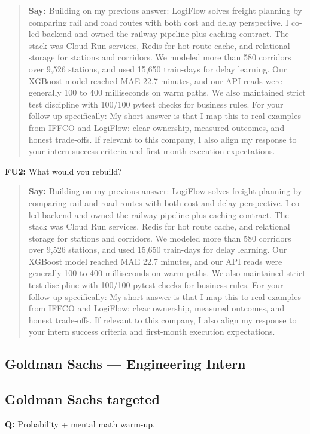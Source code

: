 \documentclass[9pt,a4paper]{article}
\begin{document}
\begin{quote}\small\textbf{Say:} Building on my previous answer: LogiFlow solves freight planning by comparing rail and road routes with both cost and delay perspective. I co-led backend and owned the railway pipeline plus caching contract. The stack was Cloud Run services, Redis for hot route cache, and relational storage for stations and corridors. We modeled more than 580 corridors over 9,526 stations, and used 15,650 train-days for delay learning. Our XGBoost model reached MAE 22.7 minutes, and our API reads were generally 100 to 400 milliseconds on warm paths. We also maintained strict test discipline with 100/100 pytest checks for business rules. For your follow-up specifically: My short answer is that I map this to real examples from IFFCO and LogiFlow: clear ownership, measured outcomes, and honest trade-offs. If relevant to this company, I also align my response to your intern success criteria and first-month execution expectations.\end{quote}
\vspace{2mm}
\textbf{FU2:} What would you rebuild?

\begin{quote}\small\textbf{Say:} Building on my previous answer: LogiFlow solves freight planning by comparing rail and road routes with both cost and delay perspective. I co-led backend and owned the railway pipeline plus caching contract. The stack was Cloud Run services, Redis for hot route cache, and relational storage for stations and corridors. We modeled more than 580 corridors over 9,526 stations, and used 15,650 train-days for delay learning. Our XGBoost model reached MAE 22.7 minutes, and our API reads were generally 100 to 400 milliseconds on warm paths. We also maintained strict test discipline with 100/100 pytest checks for business rules. For your follow-up specifically: My short answer is that I map this to real examples from IFFCO and LogiFlow: clear ownership, measured outcomes, and honest trade-offs. If relevant to this company, I also align my response to your intern success criteria and first-month execution expectations.\end{quote}
\vspace{2mm}
\newpage
\subsection{Goldman Sachs --- Engineering Intern}
\subsection{Goldman Sachs targeted}
\textbf{Q:} Probability + mental math warm-up.
\end{document}
